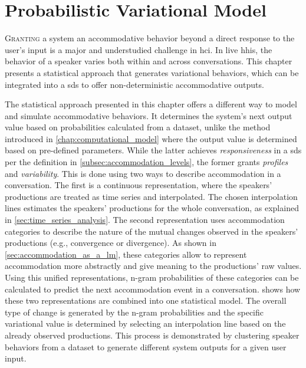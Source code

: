 \chapter{Probabilistic Variational Model}
\label{chap:statistical_model}

\lettrine{G}{ranting} a system an accommodative behavior beyond a direct response to the user's input is a major and understudied challenge in \acs{hci}.
In live \acsp{hhi}, the behavior of a speaker varies both within and across conversations.
This chapter presents a statistical approach that generates variational behaviors, which can be integrated into a \acl{sds} to offer non-deterministic accommodative outputs.

\pagebreak

\acresetall

\noindent
The statistical approach presented in this chapter offers a different way to model and simulate accommodative behaviors.
It determines the system's next output value based on probabilities calculated from a dataset, unlike the method introduced in \cref{chap:computational_model} where the output value is determined based on pre-defined parameters.
While the latter achieves \emph{responsiveness} in a \ac{sds} per the definition in \cref{subsec:accommodation_levels}, the former grants \emph{profiles} and \emph{variability}.
This is done using two ways to describe accommodation in a conversation.
The first is a continuous representation, where the speakers' productions are treated as time series and interpolated.
The chosen interpolation lines estimates the speakers' productions for the whole conversation, as explained in \cref{sec:time_series_analysis}.
The second representation uses accommodation categories to describe the nature of the mutual changes observed in the speakers' productions (e.g., convergence or divergence).
As shown in \cref{sec:accommodation_as_a_lm}, these categories allow to represent accommodation more abstractly and give meaning to the productions' raw values.
Using this unified representations, n-gram probabilities of these categories can be calculated to predict the next accommodation event in a conversation.
 shows how these two representations are combined into one statistical model.
The overall type of change is generated by the n-gram probabilities and the specific variational value is determined by selecting an interpolation line based on the already observed productions.
This process is demonstrated by clustering speaker behaviors from a dataset to generate different system outputs for a given user input.


